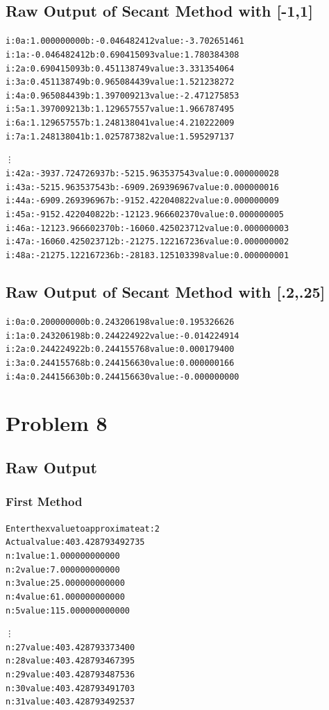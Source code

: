 \documentclass[11pt]{article} %
\begin{document}
\subsection*{Raw Output of Secant Method with [-1,1]}
\begin{alltt}
i: 0	a: 1.000000000	b: -0.046482412	value: -3.702651461
i: 1	a: -0.046482412	b: 0.690415093	value: 1.780384308
i: 2	a: 0.690415093	b: 0.451138749	value: 3.331354064
i: 3	a: 0.451138749	b: 0.965084439	value: 1.521238272
i: 4	a: 0.965084439	b: 1.397009213	value: -2.471275853
i: 5	a: 1.397009213	b: 1.129657557	value: 1.966787495
i: 6	a: 1.129657557	b: 1.248138041	value: 4.210222009
i: 7	a: 1.248138041	b: 1.025787382	value: 1.595297137

\vdots
i: 42	a: -3937.724726937	b: -5215.963537543	value: 0.000000028
i: 43	a: -5215.963537543	b: -6909.269396967	value: 0.000000016
i: 44	a: -6909.269396967	b: -9152.422040822	value: 0.000000009
i: 45	a: -9152.422040822	b: -12123.966602370	value: 0.000000005
i: 46	a: -12123.966602370	b: -16060.425023712	value: 0.000000003
i: 47	a: -16060.425023712	b: -21275.122167236	value: 0.000000002
i: 48	a: -21275.122167236	b: -28183.125103398	value: 0.000000001

\end{alltt}
\subsection*{Raw Output of Secant Method with [.2,.25]}
\begin{alltt}

i: 0	a: 0.200000000	b: 0.243206198	value: 0.195326626
i: 1	a: 0.243206198	b: 0.244224922	value: -0.014224914
i: 2	a: 0.244224922	b: 0.244155768	value: 0.000179400
i: 3	a: 0.244155768	b: 0.244156630	value: 0.000000166
i: 4	a: 0.244156630	b: 0.244156630	value: -0.000000000

\end{alltt}
\section*{Problem 8}
\subsection*{Raw Output}
\subsubsection*{First Method}
\begin{alltt}
Enter the x value to approximate at: 2
Actual value: 403.428793492735 
n: 1	value: 1.000000000000
n: 2	value: 7.000000000000
n: 3	value: 25.000000000000
n: 4	value: 61.000000000000
n: 5	value: 115.000000000000

\vdots
n: 27	value: 403.428793373400
n: 28	value: 403.428793467395
n: 29	value: 403.428793487536
n: 30	value: 403.428793491703
n: 31	value: 403.428793492537
\end{alltt}
\end{document}
